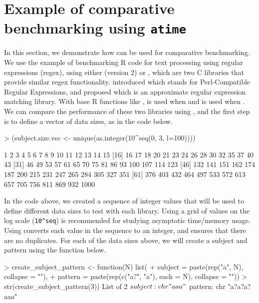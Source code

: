 \section{Example of comparative benchmarking using \texttt{atime}}

In this section, we demonstrate how  can be used for comparative benchmarking.
We use the example of benchmarking R code for text processing using regular expressions (regex), using either  (version 2) or , which are two C libraries that provide similar regex functionality.
\citet{PCRE} introduced  which stands for Perl-Compatible Regular Expressions, and \citet{TRE} proposed  which is an approximate regular expression matching library.
With base R functions like ,  is used when  and  is used when .
We can compare the performance of these two libraries using , and the first step is to define a vector of data sizes, as in the code below.



\begin{Schunk}
\begin{Sinput}
> (subject.size.vec <- unique(as.integer(10^seq(0, 3, l=100))))
\end{Sinput}
\begin{Soutput}
 [1]    1    2    3    4    5    6    7    8    9   10   11   12   13   14   15
[16]   16   17   18   20   21   23   24   26   28   30   32   35   37   40   43
[31]   46   49   53   57   61   65   70   75   81   86   93  100  107  114  123
[46]  132  141  151  162  174  187  200  215  231  247  265  284  305  327  351
[61]  376  403  432  464  497  533  572  613  657  705  756  811  869  932 1000
\end{Soutput}
\end{Schunk}

In the code above, we created a sequence of integer values that will be used to define different data sizes to test with each library.
Using a grid of values on the log scale (\verb|10^seq|) is recommended for studying asymptotic time/memory usage.
Using  converts each value in the sequence to an integer, and  ensures that there are no duplicates.
For each of the data sizes above, we will create a subject and pattern using the function below.

\begin{Schunk}
\begin{Sinput}
> create_subject_pattern <- function(N) list(
+   subject = paste(rep("a", N), collapse = ""),
+   pattern = paste(rep(c("a?", "a"), each = N), collapse = ""))
> str(create_subject_pattern(3))
List of 2
 $ subject: chr "aaa"
 $ pattern: chr "a?a?a?aaa"
\end{Sinput}
\end{Schunk}

